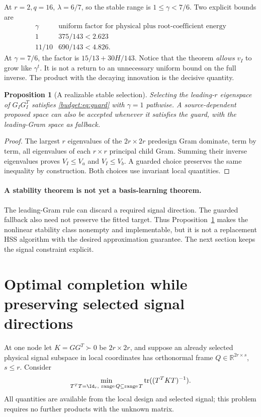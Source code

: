 \documentclass[11pt,oneside,openany,a4paper]{book}
\numberwithin{equation}{chapter}
\newtheorem{proposition}[theorem]{Proposition}
\theoremstyle{definition}
\theoremstyle{remark}
\newcommand{\R}{\mathbb R}\newcommand{\E}{\mathbb E}\newcommand{\Prb}{\mathbb P}\newcommand{\PP}{\mathbb P}
\DeclareMathOperator{\tr}{tr}\DeclareMathOperator{\rank}{rank}
\DeclareMathOperator{\ran}{range}\DeclareMathOperator{\OPT}{OPT}
\begin{document}
At $r=2,q=16$, $\lambda=6/7$, so the stable range is $1\le\gamma<7/6$. Two explicit bounds are
\begin{equation}\label{budget:eq:explicitpositive}
 \begin{array}{c|c}
 \gamma&\text{uniform factor for physical plus root-coefficient energy}\\\hline
 1&375/143<2.623\\
 11/10&690/143<4.826.
 \end{array}
\end{equation}
At $\gamma=7/6$, the factor is $15/13+30H/143$. Notice that the theorem \emph{allows} $v_I$ to grow like $\gamma^t$. It is not a return to an unnecessary uniform bound on the full inverse. The product with the decaying innovation is the decisive quantity.

\begin{proposition}[A realizable stable selection]\label{budget:prop:strong}
Selecting the leading-$r$ eigenspace of $G_IG_I^T$ satisfies \eqref{budget:eq:guard} with $\gamma=1$ pathwise. A source-dependent proposed space can also be accepted whenever it satisfies the guard, with the leading-Gram space as fallback.
\end{proposition}
\begin{proof}
The largest $r$ eigenvalues of the $2r\times2r$ predesign Gram dominate, term by term, all eigenvalues of each $r\times r$ principal child Gram. Summing their inverse eigenvalues proves $V_I\le V_a$ and $V_I\le V_b$. A guarded choice preserves the same inequality by construction. Both choices use invariant local quantities.
\end{proof}

\paragraph{A stability theorem is not yet a basis-learning theorem.}
The leading-Gram rule can discard a required signal direction. The guarded fallback also need not preserve the fitted target. Thus Proposition~\ref{budget:prop:strong} makes the nonlinear stability class nonempty and implementable, but it is not a replacement HSS algorithm with the desired approximation guarantee. The next section keeps the signal constraint explicit.

\section{Optimal completion while preserving selected signal directions}\label{budget:sec:completion}
At one node let $K=GG^T\succ0$ be $2r\times2r$, and suppose an already selected physical signal subspace in local coordinates has orthonormal frame $Q\in\R^{2r\times s}$, $s\le r$. Consider
\begin{equation}\label{budget:eq:optimization}
 \min_{T^TT=\Id_r,\ \ran Q\subseteq\ran T}
 \tr((T^TKT)^{-1}).
\end{equation}
All quantities are available from the local design and selected signal; this problem requires no further products with the unknown matrix.
\end{document}
